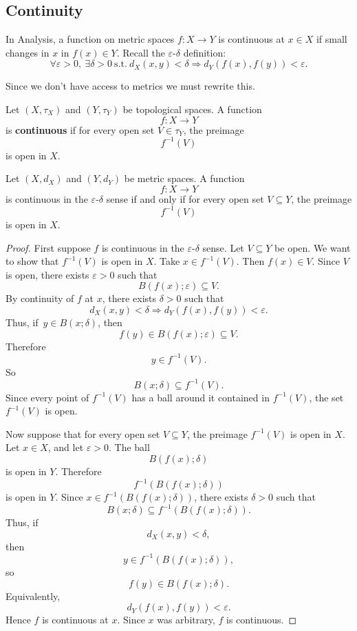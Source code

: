 \documentclass[11pt]{article}
\begin{document}
\subsection*{Continuity}
In Analysis, a function on metric spaces $f : X \to Y$ 
is continuous at $x\in X$ if small changes in $x$ in 
$f(x) \in Y$. Recall the $\varepsilon$-$\delta$ definition: 
\[
    \forall \varepsilon > 0, \ \exists \delta > 0 \ \text{s.t.} \ 
    d_X(x,y) < \delta \Rightarrow d_Y(f(x), f(y)) < \varepsilon.
\]

Since we don't have access to metrics we must rewrite this. 

\begin{defn}[Continuity]
    Let $(X,\tau_X)$ and $(Y,\tau_Y)$ be topological spaces. 
    A function 
    \[
        f : X \to Y
    \]
    is \textbf{continuous} if for every open set $V \in \tau_Y$, 
    the preimage 
    \[
        f^{-1}(V)
    \]
    is open in $X$. 
\end{defn}

\begin{prop}
    Let $(X,d_X)$ and $(Y,d_Y)$ be metric spaces. 
    A function 
    \[
        f : X \to Y
    \]
    is continuous in the $\varepsilon$-$\delta$ sense if 
    and only if for every open set $V \subseteq Y$, the 
    preimage 
    \[
        f^{-1}(V)
    \]
    is open in $X$.
\end{prop}
\begin{proof}
    First suppose $f$ is continuous in the $\varepsilon$-$\delta$ 
    sense. 
    Let $V \subseteq Y$ be open. We want to show that $f^{-1}(V)$ is 
    open in $X$. Take $x \in f^{-1}(V)$. Then 
    $f(x) \in V$. Since $V$ is open, there exists 
    $\varepsilon > 0$ such that 
    \[
        B(f(x) ; \varepsilon) \subseteq V. 
    \]
    By continuity of $f$ at $x$, there exists $\delta > 0$ such that 
    \[
        d_X(x,y) < \delta \Rightarrow d_Y(f(x),f(y)) < \varepsilon. 
    \]
    Thus, if $y \in B(x;\delta)$, then 
    \[
        f(y) \in B(f(x);\varepsilon) \subseteq V. 
    \]
    Therefore 
    \[
        y \in f^{-1}(V). 
    \]
    So 
    \[
        B(x;\delta) \subseteq f^{-1}(V). 
    \]
    Since every point of $f^{-1}(V)$ has a ball around it 
    contained in $f^{-1}(V)$, the set $f^{-1}(V)$ is open. 
    
    Now suppose that for every open set $V \subseteq Y$, the 
    preimage $f^{-1}(V)$ is open in $X$. 
    Let $x \in X$, and let $\varepsilon > 0$. The ball 
    \[
        B(f(x) ; \delta)
    \]
    is open in $Y$. Therefore 
    \[
        f^{-1}(B(f(x);\delta))
    \]
    is open in $Y$. 
    Since $x \in f^{-1}(B(f(x);\delta))$, there exists 
    $\delta > 0$ such that 
    \[
        B(x;\delta) \subseteq f^{-1}(B(f(x);\delta)). 
    \]
    Thus, if 
    \[
        d_X(x,y) < \delta, 
    \]
    then 
    \[
        y \in f^{-1}(B(f(x);\delta)), 
    \]
    so 
    \[
        f(y) \in B(f(x);\delta). 
    \]
    Equivalently, 
    \[
        d_Y(f(x),f(y)) < \varepsilon. 
    \]
    Hence $f$ is continuous at $x$. Since $x$ was arbitrary, 
    $f$ is continuous.
\end{proof}
\end{document}
